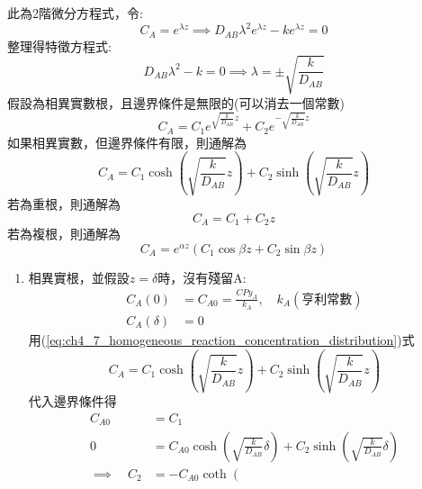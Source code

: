 \documentclass[../main.tex]{subfiles}
\begin{document}
\begin{itemize}
\begin{itemize}
    此為2階微分方程式，令:
    \begin{equation}
      C_A = e^{\lambda z} \implies D_{AB}\lambda^2 e^{\lambda z} - k e^{\lambda z} = 0
    \end{equation}
    整理得特徵方程式:
    \begin{equation}
      D_{AB}\lambda^2 - k = 0 \implies \lambda = \pm \sqrt{\frac{k}{D_{AB}}}
    \end{equation}
    假設為相異實數根，且邊界條件是無限的(可以消去一個常數)
    \begin{equation}
      C_A = C_1 e^{\sqrt{\frac{k}{D_{AB}}} z} + C_2 e^{-\sqrt{\frac{k}{D_{AB}}} z}
    \end{equation}
    如果相異實數，但邊界條件有限，則通解為
    \begin{equation}
      C_A = C_1 \cosh \left(
        \sqrt{\frac{k}{D_{AB}}} z
      \right) + C_2 \sinh \left(
        \sqrt{\frac{k}{D_{AB}}} z
      \right) \label{eq:ch4_7_homogeneous_reaction_concentration_distribution}
    \end{equation}
    若為重根，則通解為
    \begin{equation}
      C_A = C_1 + C_2 z
    \end{equation}
    若為複根，則通解為
    \begin{equation}
      C_A = e^{\alpha z} (C_1 \cos \beta z + C_2 \sin \beta z)
    \end{equation}
    \begin{enumerate}
      \item 相異實根，並假設$z=\delta$時，沒有殘留A:
      \begin{align}
        C_A(0) &= C_{A0} = \frac{CPy_A}{k_A}, \quad k_A(\text{亨利常數})\\
        C_A(\delta) &= 0
      \end{align}
      用(\ref{eq:ch4_7_homogeneous_reaction_concentration_distribution})式
      \begin{equation}
        C_A = C_1 \cosh \left(
        \sqrt{\frac{k}{D_{AB}}} z
      \right) + C_2 \sinh \left(
        \sqrt{\frac{k}{D_{AB}}} z
      \right)
      \end{equation}
      代入邊界條件得
      \begin{align}
        C_{A0} &= C_1\\
        0 &= C_{A0} \cosh \left(
          \sqrt{\frac{k}{D_{AB}}} \delta
        \right) + C_2 \sinh \left(
          \sqrt{\frac{k}{D_{AB}}} \delta
        \right) \nonumber \\
        \implies \quad C_2 &= -C_{A0} \coth \left(

\end{align}
\end{enumerate}
\end{itemize}
\end{itemize}
\end{document}
